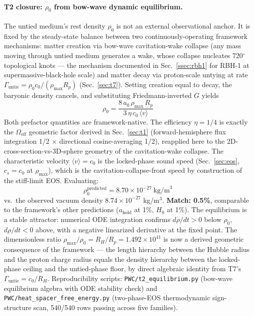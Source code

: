 \documentclass[aps,prd,twocolumn,superscriptaddress,amsmath,amssymb,nofootinbib,floatfix]{revtex4-2}
\newcommand{\amax}{a_{\text{hold}}}
\newcommand{\rhomax}{\rho_{\max}}
\newcommand{\rhonaught}{\rho_{0}}
\newcommand{\cnaught}{c_{0}}
\begin{document}
\paragraph*{T2 closure: $\rhonaught$ from bow-wave dynamic equilibrium.}
The untied medium's rest density $\rhonaught$ is not an external observational anchor. It is fixed by the steady-state balance between two continuously-operating framework mechanisms: matter creation via bow-wave cavitation-wake collapse (any mass moving through untied medium generates a wake, whose collapse nucleates 720$^{\circ}$ topological knots --- the mechanism documented in Sec.~\ref{ssec:rbh1} for RBH-1 at supermassive-black-hole scale) and matter decay via proton-scale untying at rate $\Gamma_{\text{untie}} = \rhonaught \cnaught/(\rhomax R_p)$ (Sec.~\ref{sec:t7}). Setting creation equal to decay, the baryonic density cancels, and substituting Friedmann-inverted $G$ yields
\begin{equation}
\boxed{\rhonaught = \frac{8\,a_0\,\rhomax\,R_p}{3\,\eta\,\cnaught\,\langle v\rangle}}
\label{eq:rho0}
\end{equation}
Both prefactor quantities are framework-native. The efficiency $\eta = 1/4$ is exactly the $\Omega_{\text{eff}}$ geometric factor derived in Sec.~\ref{sec:t1} (forward-hemisphere flux integration 1/2 $\times$ directional cosine-averaging 1/2), reapplied here to the 2D-cross-section-vs-3D-sphere geometry of the cavitation-wake collapse. The characteristic velocity $\langle v \rangle = \cnaught$ is the locked-phase sound speed (Sec.~\ref{sec:eos}, $c_s = \cnaught$ at $\rhomax$), which is the cavitation-collapse-front speed by construction of the stiff-limit EOS. Evaluating:
\begin{equation}
\rhonaught^{\text{predicted}} = 8.70 \times 10^{-27}~\text{kg/m}^3
\end{equation}
vs.\ the observed vacuum density $8.74 \times 10^{-27}$ kg/m$^3$. \textbf{Match: 0.5\%}, comparable to the framework's other predictions ($\amax$ at 1\%, $H_0$ at 1\%). The equilibrium is a stable attractor: numerical ODE integration confirms $d\rho/dt > 0$ below $\rhonaught$, $d\rho/dt < 0$ above, with a negative linearized derivative at the fixed point. The dimensionless ratio $\rhomax/\rhonaught = R_H/R_p = 1.492 \times 10^{41}$ is now a derived geometric consequence of the framework --- the length hierarchy between the Hubble radius and the proton charge radius equals the density hierarchy between the locked-phase ceiling and the untied-phase floor, by direct algebraic identity from T7's $\Gamma_{\text{untie}} = \cnaught/R_H$. Reproducibility scripts: \texttt{PWC/t2\_equilibrium.py} (bow-wave equilibrium algebra with ODE stability check) and \texttt{PWC/heat\_spacer\_free\_energy.py} (two-phase-EOS thermodynamic sign-structure scan, 540/540 rows passing across five families).
\end{document}

